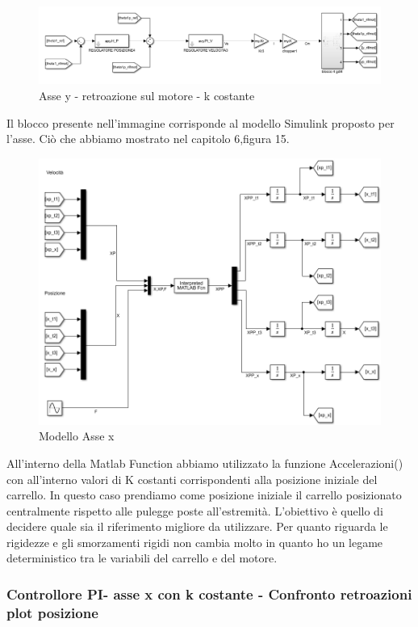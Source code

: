 \documentclass{article}
\begin{document}
\begin{figure}[H]
\centering
\includegraphics[width=.8\textwidth]{./simulink/ldm_variabile/PIDY_RMOTORE}
\caption{Asse y - retroazione sul motore - k costante}
\end{figure}
Il blocco presente nell'immagine corrisponde al modello Simulink proposto per l'asse. Ciò che abbiamo mostrato nel capitolo 6,figura 15.
\begin{figure}[H]
    \centering
    \includegraphics[width=.8\textwidth]{./simulink/assex/modellox.png}
    \caption{Modello Asse x}
\end{figure}
All'interno della Matlab Function abbiamo utilizzato la funzione Accelerazioni() con all'interno valori di K costanti corrispondenti alla posizione iniziale del carrello. In questo caso prendiamo come posizione iniziale il carrello posizionato centralmente rispetto alle pulegge poste all'estremità.
L'obiettivo è quello di decidere quale sia il riferimento migliore da utilizzare. Per quanto riguarda le rigidezze e gli smorzamenti rigidi non cambia molto in quanto ho un legame deterministico tra le variabili del carrello e del motore.

\subsubsection{Controllore PI- asse x con k costante - Confronto retroazioni plot posizione}
\end{document}

